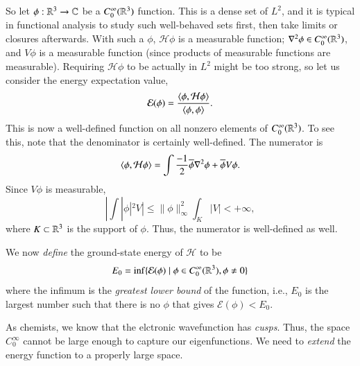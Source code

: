 So let $\phi : \mathbb{R}^3 \to \mathbb{C}$ be a $C^\infty_0(\mathbb{R}^3)$ function. This is a dense set of $L^2$, and it is typical in functional analysis to study such well-behaved sets first, then take limits or closures afterwards. With such a $\phi$,  $\mathcal{H}\phi$ is a measurable function; $\nabla^2\phi \in C^\infty_0(\mathbb{R}^3)$, and $V\phi$ is a measurable function (since products of measurable functions are measurable). Requiring $\mathcal{H}\phi$ to be actually in $L^2$ might be too strong, so let us consider the energy expectation value,
\begin{equation}
\mathcal{E}(\phi) = \frac{\braket{\phi,\mathcal{H}\phi}}{\braket{\phi,\phi}}. 
\end{equation}
This is now a well-defined function on all nonzero elements of $C^\infty_0(\mathbb{R}^3)$.  To see this, note that the denominator is certainly well-defined. The numerator is
\begin{equation}
    \braket{\phi,\mathcal{H}\phi} = \int \frac{-1}{2} \overline{\phi} \nabla^2 \phi + \overline{\phi} V\phi.
\end{equation}
Since $V\phi$ is measurable,
\begin{equation}
    |\int |\phi|^2 V | \leq \|\phi\|_\infty^2 \int_K |V| < + \infty,
\end{equation}
where $K\subset \mathbb{R}^3$ is the support of $\phi$. Thus, the numerator is well-defined as well.

We now \emph{define} the ground-state energy of $\mathcal{H}$ to be
\begin{equation}
    E_0 = \inf \{ \mathcal{E}(\phi) \mid \phi \in C^\infty_0(\mathbb{R}^3), \phi \neq 0 \}
\end{equation}
where the infimum is the \emph{greatest lower bound} of the function, i.e., $E_0$ is the largest number such that there is no $\phi$ that gives $\mathcal{E}(\phi) < E_0$. 

As chemists, we know that the elctronic wavefunction has \emph{cusps}. Thus, the space $C^\infty_0$ cannot be large enough to capture our eigenfunctions. We need to \emph{extend} the energy function to a properly large space.


